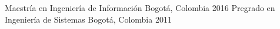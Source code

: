 

\begin{cventries}
  \vspace{-0.9cm}
  \cventry{}{}{}{}{}
  {Maestría en Ingeniería de Información} %
  {Bogotá, Colombia} %
  {2016 }{}
  {Pregrado en Ingeniería de Sistemas} %
  {Bogotá, Colombia} %
  {2011 }{}
  \vspace{-0.3cm}
\end{cventries}
